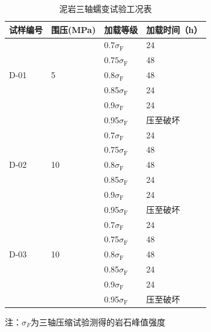 \begin{table}[ht!]\small
    \centering
    \begin{threeparttable}
    \begin{tabular}{p{3cm}<{\centering} p{3cm}<{\centering} p{3cm}<{\centering} p{3cm}<{\centering}}
        \toprule
        试样编号  & 围压(MPa)  &  加载等级   &  加载时间（h）\\
        \midrule
                    &    &   0.7$\sigma_\mathrm{F}$   &  24   \\ 
                    &    &   0.7$5\sigma_\mathrm{F}$  &  48   \\ 
        D-01       &  5 &   0.8$\sigma_\mathrm{F}$   &  48  \\
                    &    &   0.85$\sigma_\mathrm{F}$  &  24  \\
                    &    &   0.9$\sigma_\mathrm{F}$  &  24  \\
                    &    &   0.95$\sigma_\mathrm{F}$  &  压至破坏  \\ 
        \midrule
                    &    &   0.7$\sigma_\mathrm{F}$   &  24   \\ 
                    &    &   0.75$\sigma_\mathrm{F}$  &  48   \\ 
        D-02        &  10 &   0.8$\sigma_\mathrm{F}$   &  48  \\
                    &    &   0.85$\sigma_\mathrm{F}$  &  24  \\
                    &    &   0.9$\sigma_\mathrm{F}$  &  24  \\
                    &    &   0.95$\sigma_\mathrm{F}$  &  压至破坏  \\
        \midrule
                    &    &   0.7$\sigma_\mathrm{F}$   &  24   \\ 
                    &    &   0.75$\sigma_\mathrm{F}$  &  48   \\ 
        D-03        &  10 &   0.8$\sigma_\mathrm{F}$   &  48  \\
                    &    &   0.85$\sigma_\mathrm{F}$  &  24  \\
                    &    &   0.9$\sigma_\mathrm{F}$  &  24  \\
                    &    &   0.95$\sigma_\mathrm{F}$  &  压至破坏  \\
        \bottomrule
    \end{tabular}
     \begin{tablenotes}    
        \footnotesize               
        \item 注：$\sigma_F$为三轴压缩试验测得的岩石峰值强度
     \end{tablenotes}            
    \end{threeparttable}       
    \caption{泥岩三轴蠕变试验工况表}
    \label{tab:泥岩三轴蠕变试验工况表}
\end{table}

